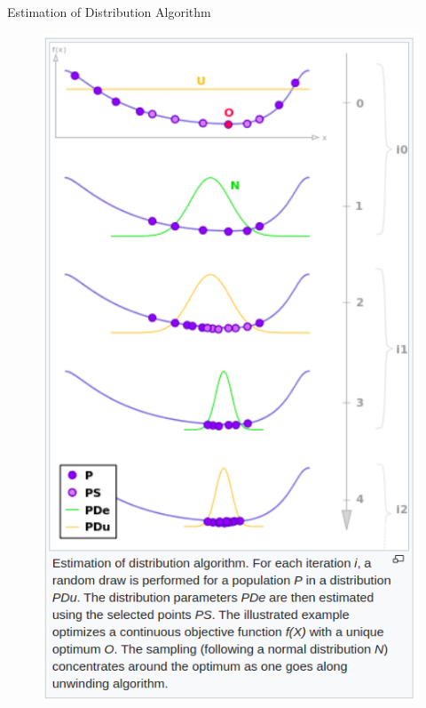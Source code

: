 \documentclass[11pt,compress,t,notes=noshow, xcolor=table]{beamer}
\begin{document}
\begin{frame}{Estimation of Distribution Algorithm}
\begin{minipage}{0.62\textwidth}
\end{minipage}\hfill
\begin{minipage}{0.35\textwidth}\raggedleft
\begin{figure}
  \includegraphics[width=1\textwidth, height=0.9\textheight]{figure_man/cmaes/cmaes_eda.png}
\end{figure}
\end{minipage}

\end{frame}
\end{document}
